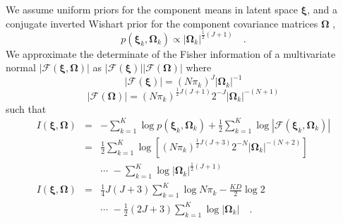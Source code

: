\documentclass[twocolumn]{aastex62}
\newcommand{\vect}[1]{\boldsymbol{\mathbf{#1}}}
\renewcommand{\vec}[1]{\vect{#1}}
\newcommand{\weight}{\pi}
\newcommand{\scoremeans}{\vec\xi}
\newcommand{\scorecovs}{\vec\Omega}
\newcommand{\NumData}{N}
\newcommand{\NumLatentFactors}{J}
\newcommand{\NumComponents}{K}
\newcommand{\numcomponents}{k}
\begin{document}
We assume uniform priors for the component means in latent space $\scoremeans$, 
and a conjugate inverted Wishart prior for the component covariance matrices
$\scorecovs$ \citep[Section 5.2.3;][]{Knorr-Held:2000},
\begin{equation}
	p(\scoremeans_\numcomponents,\scorecovs_\numcomponents) \propto |\scorecovs_\numcomponents|^{\frac{1}{2}(\NumLatentFactors + 1)} \quad .
\end{equation}
We approximate the determinate of the Fisher information of a multivariate normal $|\mathcal{F}(\scoremeans,\scorecovs)|$
as $|\mathcal{F}(\scoremeans)||\mathcal{F}(\scorecovs)|$ \citep{Oliver:1996,Figueiredo:2002} where
\begin{equation}
	|\mathcal{F}(\scoremeans)| = (\NumData\weight_k)^\NumLatentFactors|\scorecovs_k|^{-1}
\end{equation}
\begin{equation}
	|\mathcal{F}(\scorecovs)| = (\NumData\weight_k)^{\frac{1}{2}\NumLatentFactors(\NumLatentFactors+1)}2^{-\NumLatentFactors}|\scorecovs_k|^{-(\NumData+1)}
\end{equation}
\noindent{}such that 
\begin{eqnarray}
	I(\scoremeans,\scorecovs) &=& -\sum_{\numcomponents=1}^{\NumComponents}\log{p(\scoremeans_k,\scorecovs_k)} + \frac{1}{2}\sum_{\numcomponents=1}^{\NumComponents}\log{|\mathcal{F}(\scoremeans_k,\scorecovs_k)|} \nonumber \\
	&=& \frac{1}{2}\sum_{\numcomponents=1}^{\NumComponents}\log\left[(\NumData\weight_k)^{\frac{1}{2}\NumLatentFactors(\NumLatentFactors+3)}2^{-\NumData}|\scorecovs_k|^{-(\NumData + 2)}\right] \nonumber \\
	&& \cdots \,\, -\sum_{\numcomponents=1}^{\NumComponents}\log{|\scorecovs_k|}^{\frac{1}{2}(\NumLatentFactors + 1)} \\
I(\scoremeans,\scorecovs) &=& \frac{1}{4}\NumLatentFactors(\NumLatentFactors+3)\sum_{\numcomponents=1}^\NumComponents\log{\NumData\weight_k} - \frac{KD}{2}\log{2} \nonumber \\ 
&& \cdots \,\, -\frac{1}{2}(2\NumLatentFactors+3)\sum_{k=1}^{K}\log{|\scorecovs_k|}  \quad . \label{eq:prior_xi_omega} 
\end{eqnarray}
\end{document}
